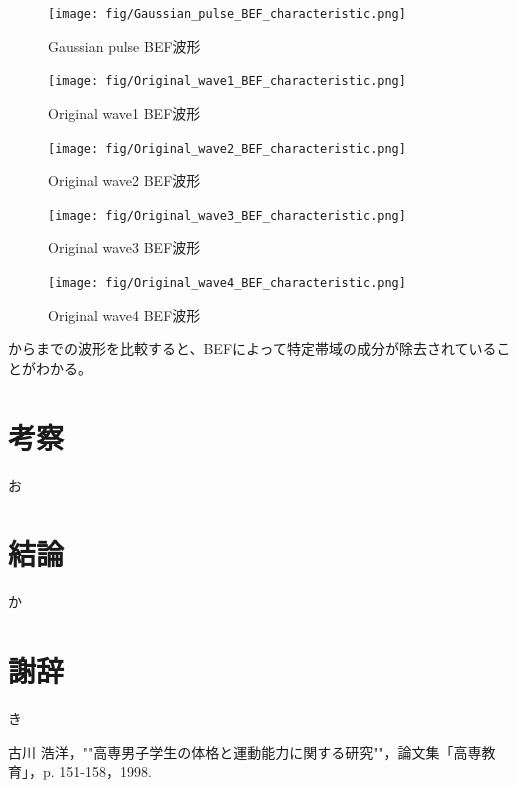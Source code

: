 \documentclass[11pt,dvipdfmx]{jarticle}
\begin{document}
\begin{figure}[H]
  \centering
  \texttt{[image: fig/Gaussian\_pulse\_BEF\_characteristic.png]}
  \caption{Gaussian pulse BEF波形}
  \label{fig:Gaussian_pulse_BEF}
\end{figure}
\begin{figure}[H]
  \centering
  \texttt{[image: fig/Original\_wave1\_BEF\_characteristic.png]}
  \caption{Original wave1 BEF波形}
  \label{fig:Original_wave1_BEF}
\end{figure}
\begin{figure}[H]
  \centering
  \texttt{[image: fig/Original\_wave2\_BEF\_characteristic.png]}
  \caption{Original wave2 BEF波形}
  \label{fig:Original_wave2_BEF}
\end{figure}
\begin{figure}[H]
  \centering
  \texttt{[image: fig/Original\_wave3\_BEF\_characteristic.png]}
  \caption{Original wave3 BEF波形}
  \label{fig:Original_wave3_BEF}
\end{figure}
\begin{figure}[H]
  \centering
  \texttt{[image: fig/Original\_wave4\_BEF\_characteristic.png]}
  \caption{Original wave4 BEF波形}
  \label{fig:Original_wave4_BEF}
\end{figure}
からまでの波形を比較すると、BEFによって特定帯域の成分が除去されていることがわかる。

\section{考察}
お

\section{結論}
か

\section{謝辞}
き


\begin{thebibliography}{99}
 古川 浩洋，""高専男子学生の体格と運動能力に関する研究""，論文集「高専教育」，p. 151-158，1998.
\end{thebibliography}
\end{document}
